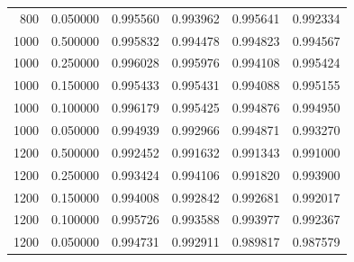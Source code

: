\begin{tabular}{rrrrrr}
800 & 0.050000 & 0.995560 & 0.993962 & 0.995641 & 0.992334 \\
1000 & 0.500000 & 0.995832 & 0.994478 & 0.994823 & 0.994567 \\
1000 & 0.250000 & 0.996028 & 0.995976 & 0.994108 & 0.995424 \\
1000 & 0.150000 & 0.995433 & 0.995431 & 0.994088 & 0.995155 \\
1000 & 0.100000 & 0.996179 & 0.995425 & 0.994876 & 0.994950 \\
1000 & 0.050000 & 0.994939 & 0.992966 & 0.994871 & 0.993270 \\
1200 & 0.500000 & 0.992452 & 0.991632 & 0.991343 & 0.991000 \\
1200 & 0.250000 & 0.993424 & 0.994106 & 0.991820 & 0.993900 \\
1200 & 0.150000 & 0.994008 & 0.992842 & 0.992681 & 0.992017 \\
1200 & 0.100000 & 0.995726 & 0.993588 & 0.993977 & 0.992367 \\
1200 & 0.050000 & 0.994731 & 0.992911 & 0.989817 & 0.987579 \\
\bottomrule
\end{tabular}

